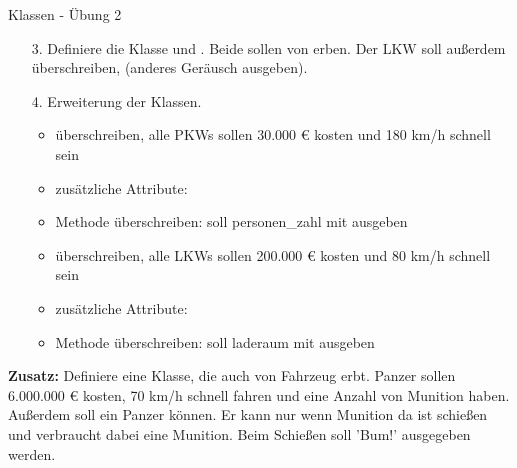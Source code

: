 \begin{frame}{Klassen - Übung 2}
	\begin{itemize}
		\item[3.] 
		Definiere die Klasse  und . Beide sollen von  erben.
		Der LKW soll außerdem  überschreiben, (anderes Geräusch ausgeben).
		
		\item[4.] 
			Erweiterung der Klassen.\linebreak
			\begin{itemize}
				\item {} überschreiben, alle PKWs sollen 30.000 € kosten und 180 km/h schnell sein
				\item zusätzliche Attribute: 
				\item {} Methode überschreiben: soll personen\_zahl mit ausgeben
			\end{itemize}
		
			\begin{itemize}
				\item {} überschreiben, alle LKWs sollen 200.000 € kosten und 80 km/h schnell sein
				\item zusätzliche Attribute: 
				\item {} Methode überschreiben: soll laderaum mit ausgeben
			\end{itemize}
	\end{itemize}
\end{frame}

\begin{frame}
	\textbf{Zusatz:} Definiere eine  Klasse, die auch von Fahrzeug erbt. Panzer sollen 6.000.000 € kosten, 70 km/h schnell fahren und eine Anzahl von Munition haben. Außerdem soll ein Panzer  können. Er kann nur wenn Munition da ist schießen und verbraucht dabei eine Munition. Beim Schießen soll 'Bum!' ausgegeben werden.
\end{frame}


